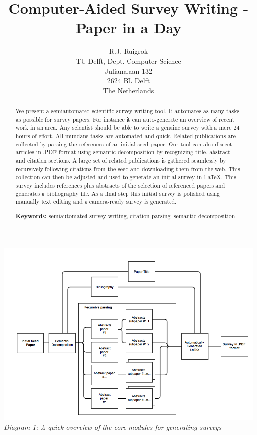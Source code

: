 \documentclass[12pt]{article}
\begin{document}
\title{Computer-Aided Survey Writing - Paper in a Day}
\author{R.J. Ruigrok\\
	TU Delft, Dept. Computer Science\\
	Julianalaan 132\\
	2624 BL Delft\\
	The Netherlands\\
	}
\date{}
\maketitle

\begin{abstract}
We present a semiautomated scientific survey writing tool. It automates as many tasks as possible for survey papers. For instance it can auto-generate an overview of recent work in an area. Any scientist should be able to write a genuine survey with a mere 24 hours of effort. All mundane tasks are automated and quick. Related publications are collected by parsing the references of an initial seed paper. Our tool can also dissect articles in .PDF format using semantic decomposition by recognizing title, abstract and citation sections. A large set of related publications is gathered seamlessly by recursively following citations from the seed and downloading them from the web. This collection can then be adjusted and used to generate an initial survey in \LaTeX. This survey includes references plus abstracts of the selection of referenced papers and generates a bibliography file. As a final step this initial survey is polished using manually text editing and a camera-ready survey is generated.


\vspace{0.3in}
\noindent
{\bf Keywords:} semiautomated survey writing, citation parsing, semantic decomposition
\end{abstract}

\includegraphics[width=17cm]{../screenshots/diagram_survey.png}
\textit{\\Diagram 1: A quick overview of the core modules for generating surveys}\\\\
\end{document}
